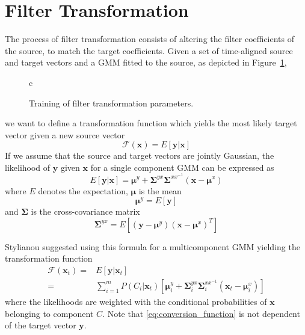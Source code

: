 \section{Filter Transformation} %
\label{the:conversion_function}
The process of filter transformation consists of altering the filter coefficients of the source, to match the target coefficients. Given a set of time-aligned source and target vectors and a GMM fitted to the source, as depicted in Figure~\ref{fig:VC_training}, 
\begin{figure}[htbp]
	\centering
	\begin{tabular}[h]{c}
	\end{tabular}
	\caption{Training of filter transformation parameters.}
	\label{fig:VC_training}
\end{figure}
we want to define a transformation function which yields the most likely target vector given a new source vector
\begin{equation}
	\mathcal{F}(\mathbf{x}) = E[\mathbf{y}\vert \mathbf{x}]
\end{equation}
If we assume that the source and target vectors are jointly Gaussian, the likelihood of $\mathbf{y}$ given $\mathbf{x}$ for a single component GMM can be expressed as \cite{kay93}
\begin{equation}
	E[\mathbf{y}\vert \mathbf{x}] = \boldsymbol{\mu}^y + \mathbf{\Sigma}^{yx} \mathbf{\Sigma}^{xx^{-1}} (\mathbf{x}-\boldsymbol{\mu}^x)
\end{equation}
where $E$ denotes the expectation, $\boldsymbol{\mu}$ is the mean
\begin{equation}
	\boldsymbol{\mu}^y = E[\mathbf{y}]
\end{equation}
and $\mathbf{\Sigma}$ is the cross-covariance matrix
\begin{equation}
	\mathbf{\Sigma}^{yx} = E[(\mathbf{y}-\boldsymbol{\mu}^y)(\mathbf{x}-\boldsymbol{\mu}^x)^T]
\end{equation}

Stylianou \etal \cite{stylianou95} suggested using this formula for a multicomponent GMM yielding the transformation function
\begin{equation}
	\label{eq:conversion_function}
	\begin{split}
		\mathcal{F}(\mathbf{x}_t) =& E[\mathbf{y}\vert \mathbf{x}_t]\\
		=& \sum_{i=1}^{m}P(C_i \vert \mathbf{x}_t)[\boldsymbol{\mu}_i^y + \mathbf{\Sigma}_i^{yx} \mathbf{\Sigma}_i^{xx^{-1}} (\mathbf{x}_t-\boldsymbol{\mu}_i^x)]
	\end{split}
\end{equation}
where the likelihoods are weighted with the conditional probabilities of $\mathbf{x}$ belonging to component $C$. Note that \eqref{eq:conversion_function} is not dependent of the target vector $\mathbf{y}$.

